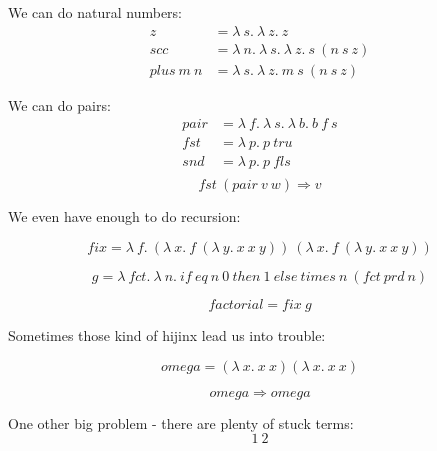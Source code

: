 \begin{frame}
  We can do natural numbers:
  \begin{align*}
  z &= \lambda~s.~\lambda~z.~z \\
  scc &= \lambda~n.~\lambda~s.~\lambda~z.~s~\left(n~s~z\right) \\
  plus~m~n &= \lambda~s.~\lambda~z.~m~s~\left(n~s~z\right)
  \end{align*}
\end{frame}

\begin{frame}
  We can do pairs:
  \begin{align*}
    pair &= \lambda~f.~\lambda~s.~\lambda~b.~b~f~s \\
    fst &= \lambda~p.~p~tru \\
    snd &= \lambda~p.~p~fls \\
  \end{align*}
  \[fst~\left(pair~v~w\right) \Rightarrow v\]
\end{frame}

\begin{frame}
  We even have enough to do recursion:
  
  \[fix = \lambda~f.~\left(\lambda~x.~f~\left(\lambda~y.~x~x~y\right)\right)~\left(\lambda~x.~f~\left(\lambda~y.~x~x~y\right)\right)\]

  \[g = \lambda~fct.~\lambda~n.~if~eq~n~0~then~1~else~times~n~\left(fct~prd~n\right)\]

  \[factorial = fix~g\]
\end{frame}

\begin{frame}
  Sometimes those kind of hijinx lead us into trouble:
  
  \[omega = \left(\lambda~x.~x~x\right) \left(\lambda~x.~x~x\right)\]

  \[omega \Rightarrow omega\]
\end{frame}

\begin{frame}
  One other big problem - there are plenty of stuck terms:
  \[1~2\]
\end{frame}

